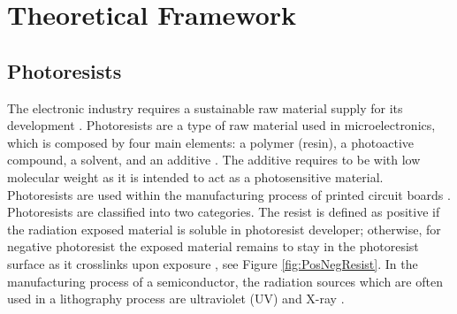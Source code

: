 
\chapter{Theoretical Framework} %

\label{Chapter:TheoreticalFramework}


\section{Photoresists}
The electronic industry requires a sustainable raw material supply for its development \cite{Sutikno2016}. Photoresists are a type of raw material used in microelectronics, which is composed by four main elements: a polymer (resin), a photoactive compound, a solvent, and an additive \cite{Schuster2009}. The additive requires to be with low molecular weight as it is intended to act as a photosensitive material. Photoresists are used within the manufacturing process of printed circuit boards \cite{Staab2011}. Photoresists are classified into two categories. The resist is defined as positive if the radiation exposed material is soluble in photoresist developer; otherwise, for negative photoresist the exposed material remains to stay in the photoresist surface as it crosslinks upon exposure \cite{Landis2011,Sharma2012}, see Figure \ref{fig:PosNegResist}. In the manufacturing process of a semiconductor, the radiation sources which are often used in a lithography process are ultraviolet (UV) and X-ray \cite{Mekaru2015}.

